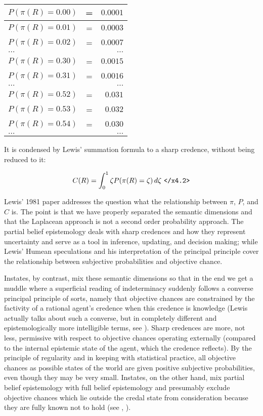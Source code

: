 \documentclass[11pt]{article}
\begin{document}
\begin{tabular}{|lcr|}
  \hline
  $P(\pi(R)=0.00)$ & = & $0.0001$ \\ \hline
  $P(\pi(R)=0.01)$ & = & $0.0003$ \\ \hline
  $P(\pi(R)=0.02)$ & = & $0.0007$ \\ \hline
  $\ldots$ & & $\ldots$ \\ \hline
  $P(\pi(R)=0.30)$ & = & $0.0015$ \\ \hline
  $P(\pi(R)=0.31)$ & = & $0.0016$ \\ \hline
  $\ldots$ & & $\ldots$ \\ \hline
  $P(\pi(R)=0.52)$ & = & $0.031$ \\ \hline
  $P(\pi(R)=0.53)$ & = & $0.032$ \\ \hline
  $P(\pi(R)=0.54)$ & = & $0.030$ \\ \hline
  $\ldots$ & & $\ldots$ \\ \hline
\end{tabular}

It is condensed by Lewis' summation formula to a sharp credence,
without being reduced to it:

\begin{equation}
  \label{eq:s2}
  C(R)=\int_{0}^{1}\zeta{}P(\pi(R)=\zeta)\,d\zeta\mbox{ \texttt{</x4.2>}}
\end{equation}

Lewis' 1981 paper 
addresses the question what the relationship between $\pi$, $P$, and
$C$ is. The point is that we have properly separated the semantic
dimensions and that the Laplacean approach is not a second order
probability approach. The partial belief epistemology deals with sharp
credences and how they represent uncertainty and serve as a tool in
inference, updating, and decision making; while Lewis' Humean
speculations and his interpretation of the principal principle cover
the relationship between subjective probabilities and objective
chance.

Instates, by contrast, mix these semantic dimensions so that in the
end we get a muddle where a superficial reading of indeterminacy
suddenly follows a converse principal principle of sorts, namely that
objective chances are constrained by the factivity of a rational
agent's credence when this credence is knowledge (Lewis actually talks
about such a converse, but in completely different and
epistemologically more intelligible terms, see
). Sharp credences are more, not less,
permissive with respect to objective chances operating externally
(compared to the internal epistemic state of the agent, which the
credence reflects). By the principle of regularity and in keeping with
statistical practice, all objective chances as possible states of the
world are given positive subjective probabilities, even though they
may be very small. Instates, on the other hand, mix partial belief
epistemology with full belief epistemology and presumably exclude
objective chances which lie outside the credal state from
consideration because they are fully known not to hold (see
, ).
\end{document}
